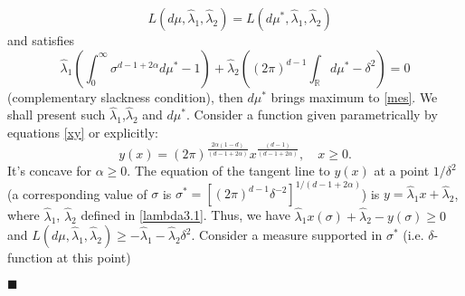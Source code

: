 \documentclass[12pt]{iopart}
\newenvironment{proof}
{\par\noindent{\bf Proof}}
{\hfill$\scriptstyle\blacksquare$}
\begin{document}
\begin{proof}
$${\begin{smallmatrix}
\end{smallmatrix}} L(d\mu,\widehat{\lambda}_1,\widehat{\lambda}_2)=L(d\mu^*,\widehat{\lambda}_1,\widehat{\lambda}_2)$$ and satisfies
$$
\widehat\lambda_1\left(\int_0^\infty\sigma^{d-1+2\alpha}d\mu^*-1\right)+\widehat\lambda_2\left((2\pi)^{d-1}\int_{\mathbb
    R}d\mu^*-\delta^2 \right)=0
$$
 (complementary slackness condition), then $d\mu^*$ brings maximum to \eqref{mes}. 
We shall present such $\widehat\lambda_1$,$\widehat\lambda_2$ and $d\mu^*$.
Consider a function given parametrically by equations \eqref{xy} or explicitly:
 \[
y(x)=(2\pi)^{\frac{2\alpha(1-d)}{(d-1+2\alpha)}}x^{\frac{(d-1)}{(d-1+2\alpha)}},\quad x\ge 0.
\]
It's concave for $\alpha\geqslant 0$. The equation of the tangent line to $y(x)$ at a point $1/\delta^2$ (a corresponding value of $\sigma$ is $\sigma^*=[(2\pi)^{d-1}\delta^{-2}]^{1/(d-1+2\alpha)}$)
is $y=\widehat\lambda_1x+\widehat\lambda_2$, where
$\widehat\lambda_1$, $\widehat\lambda_2$ defined in
\eqref{lambda3.1}. Thus, we have
$\widehat\lambda_1x(\sigma)+\widehat\lambda_2-y(\sigma)\geqslant 0$ and
$L(d\mu,\widehat\lambda_1,\widehat\lambda_2)\geqslant
-\widehat\lambda_1-\widehat\lambda_2\delta^2.$
Consider a measure supported in $\sigma^*$ (i.e. $\delta$-function at this point)

\end{proof}
\end{document}
